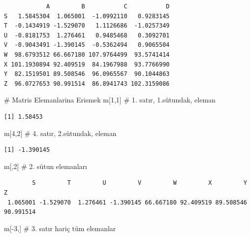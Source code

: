 \documentclass[
  letterpaper,
  DIV=11,
  numbers=noendperiod]{scrreprt}
\newenvironment{Shaded}{\begin{snugshade}}{\end{snugshade}}
\newcommand{\CommentTok}[1]{\textcolor[rgb]{0.37,0.37,0.37}{#1}}
\newcommand{\DecValTok}[1]{\textcolor[rgb]{0.68,0.00,0.00}{#1}}
\newcommand{\NormalTok}[1]{\textcolor[rgb]{0.00,0.23,0.31}{#1}}
\newcommand{\SpecialCharTok}[1]{\textcolor[rgb]{0.37,0.37,0.37}{#1}}
\begin{document}
\begin{verbatim}
            A         B           C           D
S   1.5845304  1.065001  -1.0992110   0.9283145
T  -0.1434919 -1.529070   1.1126686  -1.0257349
U  -0.8181753  1.276461   0.9485468   0.3092701
V  -0.9043491 -1.390145  -0.5362494   0.9065504
W  98.6793512 66.667180 107.9764499  93.5741414
X 101.1930894 92.409519  84.1967988  93.7766990
Y  82.1519501 89.508546  96.0965567  90.1044863
Z  96.0727653 90.991514  86.8941743 102.3159086
\end{verbatim}

\begin{Shaded}
\begin{Highlighting}[]
\CommentTok{\# Matris Elemanlarina Erismek}
\NormalTok{m[}\DecValTok{1}\NormalTok{,}\DecValTok{1}\NormalTok{] }\CommentTok{\# 1. satır, 1.sütundak, eleman}
\end{Highlighting}
\end{Shaded}

\begin{verbatim}
[1] 1.58453
\end{verbatim}

\begin{Shaded}
\begin{Highlighting}[]
\NormalTok{m[}\DecValTok{4}\NormalTok{,}\DecValTok{2}\NormalTok{] }\CommentTok{\# 4. satır, 2.sütundak, eleman}
\end{Highlighting}
\end{Shaded}

\begin{verbatim}
[1] -1.390145
\end{verbatim}

\begin{Shaded}
\begin{Highlighting}[]
\NormalTok{m[,}\DecValTok{2}\NormalTok{] }\CommentTok{\# 2. sütun elemanları}
\end{Highlighting}
\end{Shaded}

\begin{verbatim}
        S         T         U         V         W         X         Y         Z 
 1.065001 -1.529070  1.276461 -1.390145 66.667180 92.409519 89.508546 90.991514 
\end{verbatim}

\begin{Shaded}
\begin{Highlighting}[]
\NormalTok{m[}\SpecialCharTok{{-}}\DecValTok{3}\NormalTok{,] }\CommentTok{\# 3. satır hariç tüm elemanlar}
\end{Highlighting}
\end{Shaded}
\end{document}
